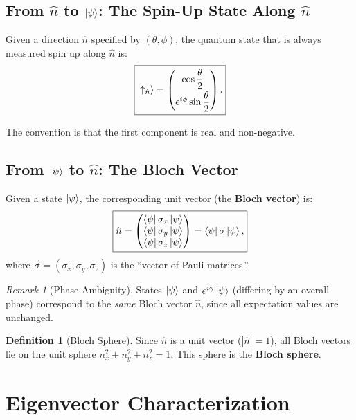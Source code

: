 \documentclass[11pt,a4paper]{article}
\theoremstyle{definition}
\newtheorem{definition}{Definition}[section]
\theoremstyle{plain}
\theoremstyle{remark}
\newtheorem{remark}{Remark}[section]
\begin{document}
\subsection{From $\hat{n}$ to $\ket{\psi}$: The Spin-Up State Along $\hat{n}$}

Given a direction $\hat{n}$ specified by $(\theta, \phi)$, the quantum state that is always measured spin up along $\hat{n}$ is:
\[
    \boxed{\ket{\uparrow_{\hat{n}}} = \begin{pmatrix} \cos\dfrac{\theta}{2} \\[6pt] e^{i\phi}\sin\dfrac{\theta}{2} \end{pmatrix}.}
\]

The convention is that the first component is real and non-negative.

\subsection{From $\ket{\psi}$ to $\hat{n}$: The Bloch Vector}

Given a state $\ket{\psi}$, the corresponding unit vector (the \textbf{Bloch vector}) is:
\[
    \boxed{\hat{n} = \begin{pmatrix} \bra{\psi}\sigma_x\ket{\psi} \\ \bra{\psi}\sigma_y\ket{\psi} \\ \bra{\psi}\sigma_z\ket{\psi} \end{pmatrix} = \bra{\psi}\vec{\sigma}\ket{\psi},}
\]
where $\vec{\sigma} = (\sigma_x, \sigma_y, \sigma_z)$ is the ``vector of Pauli matrices.''

\begin{remark}[Phase Ambiguity]
    States $\ket{\psi}$ and $e^{i\gamma}\ket{\psi}$ (differing by an overall phase) correspond to the \emph{same} Bloch vector $\hat{n}$, since all expectation values are unchanged.
\end{remark}

\begin{definition}[Bloch Sphere]
    Since $\hat{n}$ is a unit vector ($|\hat{n}| = 1$), all Bloch vectors lie on the unit sphere $n_x^2 + n_y^2 + n_z^2 = 1$. This sphere is the \textbf{Bloch sphere}.
\end{definition}

\section{Eigenvector Characterization}
\end{document}
